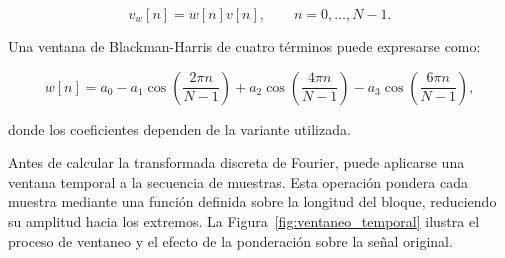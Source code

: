\begin{equation}
    v_w[n]=w[n]v[n],
    \qquad n=0,\ldots,N-1.
    \label{eq:senal_ventaneada}
\end{equation}

Una ventana de Blackman-Harris de cuatro términos puede expresarse
como:

\begin{equation}
    w[n]
    =
    a_0
    -
    a_1\cos\left(\frac{2\pi n}{N-1}\right)
    +
    a_2\cos\left(\frac{4\pi n}{N-1}\right)
    -
    a_3\cos\left(\frac{6\pi n}{N-1}\right),
    \label{eq:ventana_blackman_harris}
\end{equation}

donde los coeficientes dependen de la variante utilizada.

Antes de calcular la transformada discreta de Fourier, puede
aplicarse una ventana temporal a la secuencia de muestras. Esta operación
pondera cada muestra mediante una función definida sobre la longitud del
bloque, reduciendo su amplitud hacia los extremos. La
Figura~\ref{fig:ventaneo_temporal} ilustra el proceso de ventaneo
y el efecto de la ponderación sobre la señal original.


